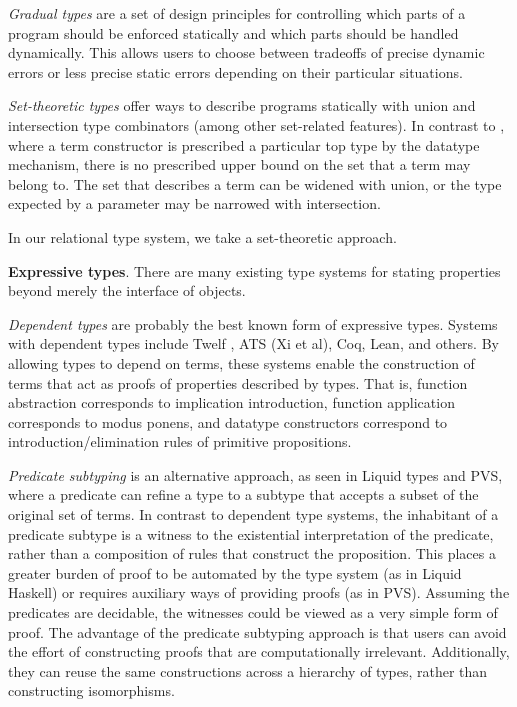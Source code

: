 \documentclass[sigplan]{acmart}
\theoremstyle{definition}
\begin{document}
\textit{Gradual types} \cite{} are a set of design principles for controlling which parts of a program
should be enforced statically and which parts should be handled dynamically. 
This allows users to choose between tradeoffs of precise dynamic errors or  
less precise static errors depending on their particular situations.

\textit{Set-theoretic types} \cite{} offer ways to describe programs statically 
with union and intersection type combinators (among other set-related features). 
In contrast to  \cite{}, where a term constructor is prescribed a particular top type by the datatype mechanism,
there is no prescribed upper bound on the set that a term may belong to. The set that describes
a term can be widened with union, or the type expected by a parameter may be narrowed with intersection. 

In our relational type system, we take a set-theoretic approach.
\newline

\noindent
\textbf{Expressive types}. There are many existing type systems for stating properties beyond 
merely the interface of objects. 

\textit{Dependent types} are probably the best known form of expressive types. 
Systems with dependent types include Twelf \cite{}, ATS (Xi et al), Coq, Lean, and others. By allowing types to depend on terms, 
these systems enable the construction of terms that act as proofs of properties described by types. 
That is, function abstraction corresponds to implication introduction, function application corresponds to modus ponens, and 
datatype constructors correspond to introduction/elimination rules of primitive propositions.

\textit{Predicate subtyping} is an alternative approach, as seen in Liquid types and PVS, 
where a predicate can refine a type to a subtype that accepts a subset of the original set of terms.
In contrast to dependent type systems, 
the inhabitant of a predicate subtype is a witness to the existential interpretation of the predicate, 
rather than a composition of rules that construct the proposition. 
This places a greater burden of proof to be automated by the type system (as in Liquid Haskell) or requires auxiliary ways of providing proofs (as in PVS).
Assuming the predicates are decidable, the witnesses could be viewed as a very simple form of proof.
The advantage of the predicate subtyping approach is that users can avoid the effort of constructing proofs that are computationally irrelevant.
Additionally, they can reuse the same constructions across a hierarchy of types, rather than constructing isomorphisms. 
\end{document}
